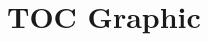 \documentclass{article}
\begin{document}
  \clearpage

  
  

  \newpage

  \section*{TOC Graphic}
\end{document}
